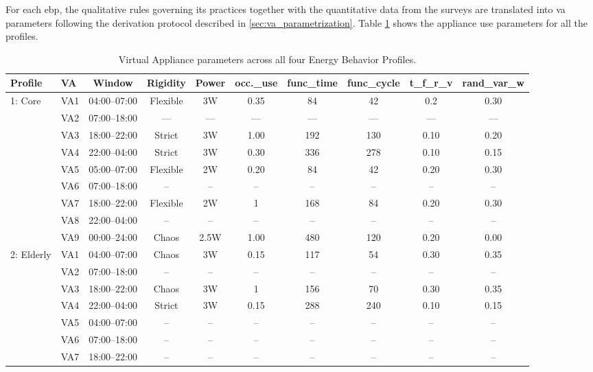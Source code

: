 \documentclass[final,3p,times,onecolumn]{elsarticle}
\begin{document}
For each \gls{ebp}, the qualitative rules governing its practices together with the quantitative data from the surveys are translated into \gls{va} parameters following the derivation protocol described in \ref{sec:va_parametrization}. Table \ref{tab:va-all} shows the appliance use parameters for all the profiles.

\begin{table}[H]
\centering
\footnotesize
\setlength{\tabcolsep}{4pt}
\caption{Virtual Appliance parameters across all four Energy Behavior Profiles.}
\label{tab:va-all}
\begin{tabular}{llcccccccc}
\toprule
\textbf{Profile} & \textbf{VA} & \textbf{Window} & \textbf{Rigidity} & \textbf{Power} & \textbf{occ.\_use} & \textbf{func\_time} & \textbf{func\_cycle} & \textbf{t\_f\_r\_v} & \textbf{rand\_var\_w} \\
\midrule
\multirow{9}{*}{1: Core}
& VA1 & 04:00--07:00 & Flexible & 3W & 0.35 & 84  & 42  & 0.2 & 0.30 \\
& VA2 & 07:00--18:00 & ---  & --- & --- & --- & ---  & --- & --- \\
& VA3 & 18:00--22:00 & Strict   & 3W & 1.00 & 192 & 130 & 0.10 & 0.20 \\
& VA4 & 22:00--04:00 & Strict   & 3W & 0.30 & 336 & 278 & 0.10 & 0.15 \\
& VA5 & 05:00--07:00 & Flexible & 2W & 0.20 & 84  & 42  & 0.20 & 0.30 \\
& VA6 & 07:00--18:00 & -- & -- & -- & -- & -- & -- & -- \\
& VA7 & 18:00--22:00 & Flexible   & 2W & 1 & 168 & 84  & 0.20 & 0.30 \\
& VA8 & 22:00--04:00 & -- & -- & -- & -- & -- & -- & -- \\
& VA9 & 00:00--24:00 & Chaos       & 2.5W & 1.00 & 480 & 120 & 0.20 & 0.00 \\
\midrule
\multirow{9}{*}{2: Elderly}
& VA1 & 04:00--07:00 & Chaos    & 3W & 0.15 & 117 & 54  & 0.30 & 0.35 \\
& VA2 & 07:00--18:00 & -- & -- & -- & -- & -- & -- & -- \\
& VA3 & 18:00--22:00 & Chaos    & 3W & 1 & 156 & 70  & 0.30 & 0.35 \\
& VA4 & 22:00--04:00 & Strict   & 3W & 0.15 & 288 & 240 & 0.10 & 0.15 \\
& VA5 & 04:00--07:00 & -- & -- & -- & -- & -- & -- & -- \\
& VA6 & 07:00--18:00 & -- & -- & -- & -- & -- & -- & -- \\
& VA7 & 18:00--22:00 & -- & -- & -- & -- & -- & -- & -- \\

\end{tabular}
\end{table}
\end{document}
